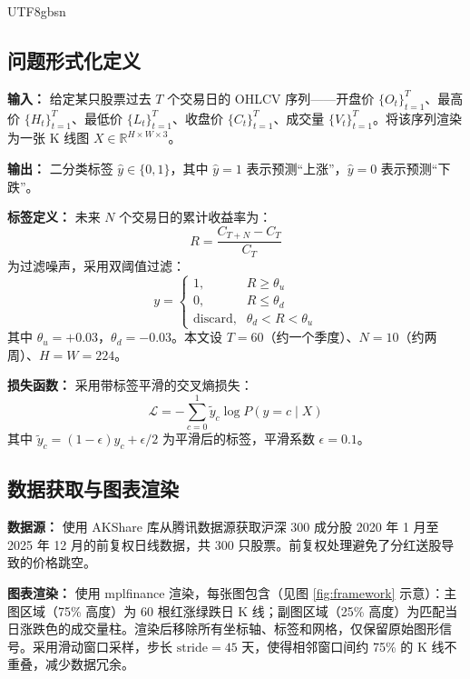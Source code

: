 \documentclass[12pt,a4paper]{article}
\begin{document}
\begin{CJK}{UTF8}{gbsn}
\subsection{问题形式化定义}

\textbf{输入：} 给定某只股票过去 $T$ 个交易日的 OHLCV 序列——开盘价 $\{O_t\}_{t=1}^T$、最高价 $\{H_t\}_{t=1}^T$、最低价 $\{L_t\}_{t=1}^T$、收盘价 $\{C_t\}_{t=1}^T$、成交量 $\{V_t\}_{t=1}^T$。将该序列渲染为一张 K 线图 $X \in \mathbb{R}^{H \times W \times 3}$。

\textbf{输出：} 二分类标签 $\hat{y} \in \{0, 1\}$，其中 $\hat{y}=1$ 表示预测``上涨''，$\hat{y}=0$ 表示预测``下跌''。

\textbf{标签定义：} 未来 $N$ 个交易日的累计收益率为：
\begin{equation}
R = \frac{C_{T+N} - C_T}{C_T} \label{eq:return}
\end{equation}
为过滤噪声，采用双阈值过滤：
\begin{equation}
y = \begin{cases}
1, & R \geq \theta_u \\[2pt]
0, & R \leq \theta_d \\[2pt]
\text{discard}, & \theta_d < R < \theta_u
\end{cases} \label{eq:label}
\end{equation}
其中 $\theta_u = +0.03$，$\theta_d = -0.03$。本文设 $T=60$（约一个季度）、$N=10$（约两周）、$H=W=224$。

\textbf{损失函数：} 采用带标签平滑的交叉熵损失：
\begin{equation}
\mathcal{L} = -\sum_{c=0}^{1} \tilde{y}_c \log P(y=c \mid X)
\end{equation}
其中 $\tilde{y}_c = (1-\epsilon) y_c + \epsilon/2$ 为平滑后的标签，平滑系数 $\epsilon=0.1$。

\subsection{数据获取与图表渲染}

\textbf{数据源：} 使用 AKShare 库从腾讯数据源获取沪深 300 成分股 2020 年 1 月至 2025 年 12 月的前复权日线数据，共 300 只股票。前复权处理避免了分红送股导致的价格跳空。

\textbf{图表渲染：} 使用 mplfinance 渲染，每张图包含（见图 \ref{fig:framework} 示意）：主图区域（75\% 高度）为 60 根红涨绿跌日 K 线；副图区域（25\% 高度）为匹配当日涨跌色的成交量柱。渲染后移除所有坐标轴、标签和网格，仅保留原始图形信号。采用滑动窗口采样，步长 $\text{stride}=45$ 天，使得相邻窗口间约 75\% 的 K 线不重叠，减少数据冗余。


\end{CJK}
\end{document}
